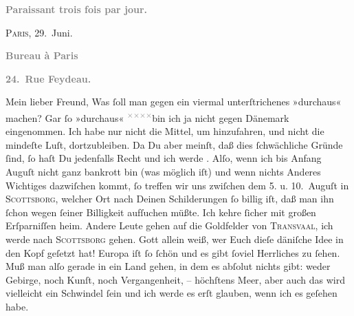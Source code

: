 \pstart
           \begin{otherlanguage}{french}\textcolor{gray}{\textbf{\textbf{Paraissant trois fois par jour.}}}\end{otherlanguage}\hfill \textsc{Paris}, 29. Juni.\pend
           
\pstart
           \begin{otherlanguage}{french}\textcolor{gray}{\textbf{\textbf{Bureau à Paris}}}\end{otherlanguage}\pend
           
\pstart
           \begin{otherlanguage}{french}\textcolor{gray}{\textbf{\textbf{24. Rue Feydeau.}}}\end{otherlanguage}\pend
           
\pstart\center{}Mein lieber Freund,\pend\vspace{0.5em}
\pstart
           Was{ }ſoll man gegen ein viermal unterſtrichenes »durchaus« machen? Gar{ }ſo »durchaus« \substVorne{}\textsuperscript{\textcolor{gray}{×}\-\textcolor{gray}{×}\-\textcolor{gray}{×}\-\textcolor{gray}{×}}\substDazwischen{}bin\substHinten{} ich ja nicht gegen Dänemark
               eingenommen. Ich habe nur nicht die Mittel, um hinzufahren, und nicht die mindeſte
               Luſt, dortzubleiben. Da Du aber meinſt, daß dies{ }ſchwächliche Gründe{ }ſind,{ }ſo haſt Du
               jedenfalls Recht und ich werde \label{K_L02779-1v}\label{K_L02779-1}. Alſo, wenn ich bis Anfang {\pb}Auguſt nicht ganz bankrott bin (was möglich iſt) und wenn
               nichts Anderes Wichtiges dazwiſchen kommt,{ }ſo treffen wir uns zwiſchen dem 5. u. 10. Auguſt in \textsc{Scottsborg}, welcher Ort nach Deinen
               Schilderungen{ }ſo billig iſt, daß man ihn{ }ſchon wegen{ }ſeiner Billigkeit aufſuchen
               müßte. Ich kehre{ }ſicher mit großen Erſparniſſen heim. Andere Leute gehen auf die
               Goldfelder von \textsc{Transvaal}, ich werde nach \textsc{Scottsborg} gehen. Gott allein weiß, wer Euch dieſe däniſche Idee in den Kopf geſetzt hat! {\pb}Europa iſt{ }ſo{ }ſchön und es gibt{ }ſoviel Herrliches
               zu{ }ſehen. Muß man alſo gerade in ein Land gehen, in dem es  abſolut nichts gibt: weder Gebirge, noch Kunſt, noch Vergangenheit, –
               höchſtens Meer, aber auch das wird vielleicht ein Schwindel{ }ſein und ich werde es
               erſt glauben, wenn ich es geſehen habe.\pend
           
